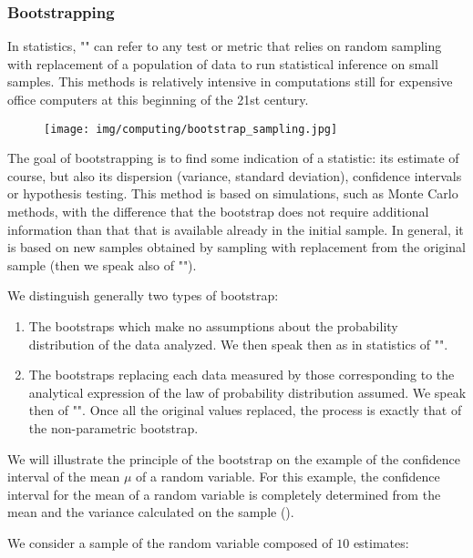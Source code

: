 	\subsubsection{Bootstrapping}\label{bootstrap}
	In statistics, "" can refer to any test or metric that relies on random sampling with replacement of a population of data to run statistical inference on small samples. This methods is relatively intensive in computations still for expensive office computers at this beginning of the 21st century.  
	\begin{figure}[H]
		\centering
		\texttt{[image: img/computing/bootstrap\_sampling.jpg]}
	\end{figure}
	The goal of bootstrapping is to find some indication of a statistic: its estimate of course, but also its dispersion (variance, standard deviation), confidence intervals or hypothesis testing. This method is based on simulations, such as Monte Carlo methods, with the difference that the bootstrap does not require additional information than that that is available already in the initial sample. In general, it is based on new samples obtained by sampling with replacement from the original sample (then we speak also of "").
	
	We distinguish generally two types of bootstrap:
	\begin{enumerate}
		\item The bootstraps which make no assumptions about the probability distribution of the data analyzed. We then speak then as in statistics of "".

		\item The bootstraps replacing each data measured by those corresponding to the analytical expression of the law of probability distribution assumed. We speak then of "". Once all the original values replaced, the process is exactly that of the non-parametric bootstrap.
	\end{enumerate}
	We will illustrate the principle of the bootstrap on the example of the confidence interval of the mean $\mu$ of a random variable. For this example, the confidence interval for the mean of a random variable is completely determined from the mean and the variance calculated on the sample ().

	We consider a sample of the random variable composed of $10$ estimates:
	
